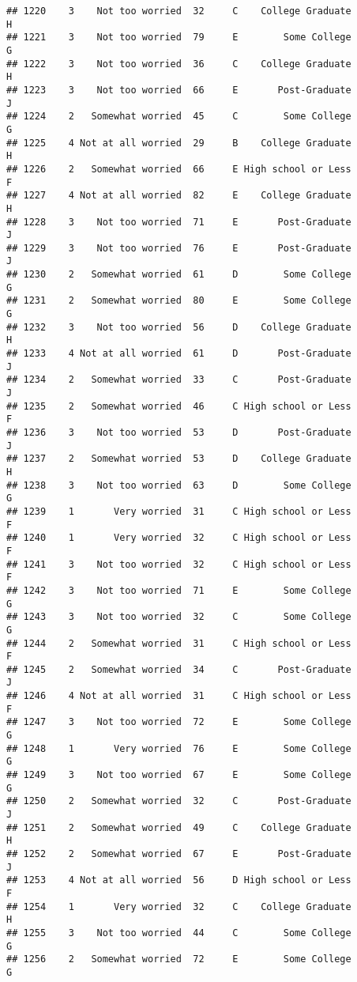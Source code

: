 \documentclass[
]{article}
\begin{document}
\begin{verbatim}
## 1220    3    Not too worried  32     C    College Graduate         H
## 1221    3    Not too worried  79     E        Some College         G
## 1222    3    Not too worried  36     C    College Graduate         H
## 1223    3    Not too worried  66     E       Post-Graduate         J
## 1224    2   Somewhat worried  45     C        Some College         G
## 1225    4 Not at all worried  29     B    College Graduate         H
## 1226    2   Somewhat worried  66     E High school or Less         F
## 1227    4 Not at all worried  82     E    College Graduate         H
## 1228    3    Not too worried  71     E       Post-Graduate         J
## 1229    3    Not too worried  76     E       Post-Graduate         J
## 1230    2   Somewhat worried  61     D        Some College         G
## 1231    2   Somewhat worried  80     E        Some College         G
## 1232    3    Not too worried  56     D    College Graduate         H
## 1233    4 Not at all worried  61     D       Post-Graduate         J
## 1234    2   Somewhat worried  33     C       Post-Graduate         J
## 1235    2   Somewhat worried  46     C High school or Less         F
## 1236    3    Not too worried  53     D       Post-Graduate         J
## 1237    2   Somewhat worried  53     D    College Graduate         H
## 1238    3    Not too worried  63     D        Some College         G
## 1239    1       Very worried  31     C High school or Less         F
## 1240    1       Very worried  32     C High school or Less         F
## 1241    3    Not too worried  32     C High school or Less         F
## 1242    3    Not too worried  71     E        Some College         G
## 1243    3    Not too worried  32     C        Some College         G
## 1244    2   Somewhat worried  31     C High school or Less         F
## 1245    2   Somewhat worried  34     C       Post-Graduate         J
## 1246    4 Not at all worried  31     C High school or Less         F
## 1247    3    Not too worried  72     E        Some College         G
## 1248    1       Very worried  76     E        Some College         G
## 1249    3    Not too worried  67     E        Some College         G
## 1250    2   Somewhat worried  32     C       Post-Graduate         J
## 1251    2   Somewhat worried  49     C    College Graduate         H
## 1252    2   Somewhat worried  67     E       Post-Graduate         J
## 1253    4 Not at all worried  56     D High school or Less         F
## 1254    1       Very worried  32     C    College Graduate         H
## 1255    3    Not too worried  44     C        Some College         G
## 1256    2   Somewhat worried  72     E        Some College         G

\end{verbatim}
\end{document}
